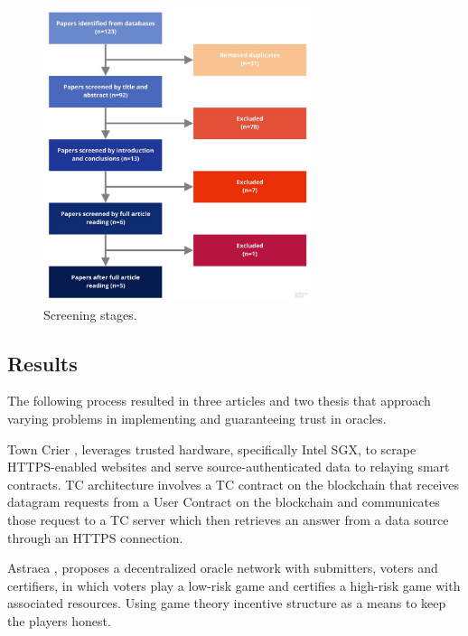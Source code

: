 \begin{figure}[t]
  \begin{center}
    \leavevmode
    \includegraphics[width=0.7\textwidth]{figures/paper-screening.jpg}
    \caption{Screening stages.}
    \label{fig:/figures/paper-screening}
  \end{center}
\end{figure}


\subsection{Results}

The following process resulted in three articles and two thesis that approach varying problems in implementing and guaranteeing trust in oracles.

Town Crier \cite{Zhang2016TownCrier}, leverages trusted hardware, specifically Intel SGX, to scrape HTTPS-enabled websites and serve source-authenticated data to relaying smart contracts. TC architecture involves a TC contract on the blockchain that receives datagram requests from a User Contract on the blockchain and communicates those request to a TC server which then retrieves an answer from a data source through an HTTPS connection.

Astraea \cite{Adler2018Astraea:Oracleb}, proposes a decentralized oracle network with submitters, voters and certifiers, in which voters play a low-risk game and certifies a high-risk game with associated resources. Using game theory incentive structure as a means to keep the players honest.

